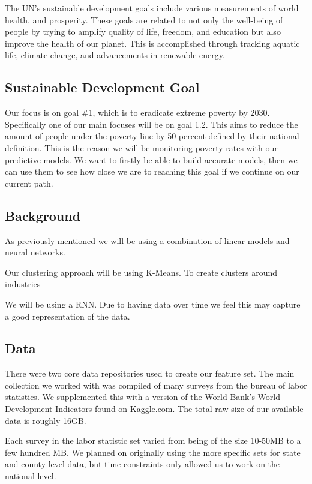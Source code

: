 \documentclass[11pt,letterpaper]{article}
\begin{document}
The UN's sustainable development goals include various measurements of world health, and prosperity\cite{UNSDG}. 
These goals are related to not only the well-being of people by trying to amplify quality of life, freedom, and education but also improve the health of our planet. This is accomplished through tracking aquatic life, climate change, and advancements in renewable energy. 

\subsection{Sustainable Development Goal}
\label{ssec:sdg}
Our focus is on goal \#1, which is to eradicate extreme poverty by 2030. Specifically one of our main focuses will be on goal 1.2. This aims to reduce the amount of people under the poverty line by 50 percent defined by their national definition. This is the reason we will be monitoring poverty rates with our predictive models. We want to firstly be able to build accurate models, then we can use them to see how close we are to reaching this goal if we continue on our current path. 

\subsection{Background}
\label{ssec:background}

As previously mentioned we will be using a combination of linear models and neural networks.

Our clustering approach will be using K-Means. To create clusters around industries

We will be using a RNN. Due to having data over time we feel this may capture a good representation of the data.


\subsection{Data}
\label{ssec:Data}

There were two core data repositories used to create our feature set. The main collection we worked with was compiled of many surveys from the bureau of labor statistics. We supplemented this with a version of the World Bank's World Development Indicators found on Kaggle.com. The total raw size of our available data is roughly 16GB. 

Each survey in the labor statistic set varied from being of the size 10-50MB to a few hundred MB. We planned on originally using the more specific sets for state and county level data, but time constraints only allowed us to work on the national level.
\end{document}
